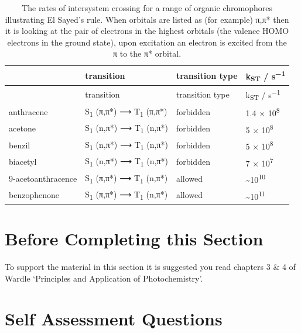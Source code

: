 \documentclass[
]{book}
\begin{document}
\begin{longtable}[]{@{}llll@{}}
\caption{\label{tab:rateST} The rates of intersystem crossing for a range of organic chromophores illustrating El Sayed's rule. When orbitals are listed as (for example) π,π* then it is looking at the pair of electrons in the highest orbitals (the valence HOMO electrons in the ground state), upon excitation an electron is excited from the π to the π* orbital.}\tabularnewline
\toprule
& transition & transition type & k\textsubscript{ST} / s\textsuperscript{−1}\tabularnewline
\midrule
\endfirsthead
\toprule
& transition & transition type & k\textsubscript{ST} / s\textsuperscript{−1}\tabularnewline
\midrule
\endhead
anthracene & S\textsubscript{1} (π,π*) ⟶ T\textsubscript{1} (π,π*) & forbidden & 1.4 × 10\textsuperscript{8}\tabularnewline
acetone & S\textsubscript{1} (n,π*) ⟶ T\textsubscript{1} (n,π*) & forbidden & 5 × 10\textsuperscript{8}\tabularnewline
benzil & S\textsubscript{1} (n,π*) ⟶ T\textsubscript{1} (n,π*) & forbidden & 5 × 10\textsuperscript{8}\tabularnewline
biacetyl & S\textsubscript{1} (n,π*) ⟶ T\textsubscript{1} (n,π*) & forbidden & 7 × 10\textsuperscript{7}\tabularnewline
9-acetoanthracence & S\textsubscript{1} (π,π*) ⟶ T\textsubscript{1} (n,π*) & allowed & \textasciitilde10\textsuperscript{10}\tabularnewline
benzophenone & S\textsubscript{1} (π,π*) ⟶ T\textsubscript{1} (n,π*) & allowed & \textasciitilde10\textsuperscript{11}\tabularnewline
\bottomrule
\end{longtable}

\hypertarget{before-completing-this-section}{%
\section{Before Completing this Section}\label{before-completing-this-section}}

To support the material in this section it is suggested you read chapters 3 \& 4 of Wardle `Principles and Application of Photochemistry'.

\hypertarget{sec:SSQemission}{%
\section{Self Assessment Questions}\label{sec:SSQemission}}
\end{document}

